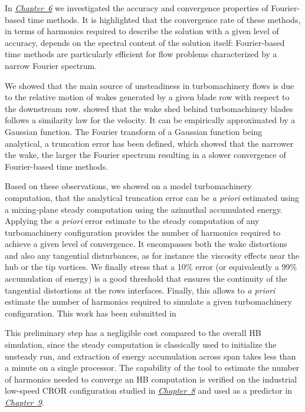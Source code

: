 In \hyperref[cha:limitations_convergence]{\emph{Chapter~6}}
we investigated the accuracy and convergence properties 
of Fourier-based time methods. It is highlighted that the convergence rate 
of these methods, in terms of harmonics required to describe the solution 
with a given level of accuracy, depends on the spectral content of the 
solution itself: Fourier-based time methods are particularly efficient 
for flow problems characterized by a narrow Fourier 
spectrum. 

We showed that the main source of unsteadiness in 
turbomachinery flows is due to the relative motion of wakes 
generated by a given blade row with respect to the downstream row.
\citet{Lakshminarayana1980} showed that the wake shed
behind turbomachinery blades follows a similarity law for the velocity. 
It can be empirically approximated by a Gaussian function.
The Fourier transform of a Gaussian function being analytical,
a truncation error has been defined, which showed that the narrower the wake, 
the larger the Fourier spectrum resulting in a slower convergence 
of Fourier-based time methods.

Based on these observations,
we showed on a model turbomachinery computation, that
the analytical truncation error can be \emph{a priori} 
estimated using a mixing-plane steady computation
using the azimuthal accumulated energy.
Applying the \emph{a priori} error estimate to 
the steady computation of any turbomachinery configuration
provides the number of harmonics required 
to achieve a given level of convergence.
It encompasses both the wake distortions and also
any tangential disturbances, as for instance
the viscosity effects near the hub or the tip vortices.
We finally stress that a 10\% error (or equivalently 
a 99\% accumulation of energy) is a good threshold
that ensures the continuity of the tangential distortions at the rows
interfaces. Finally, this allows to \emph{a priori}
estimate the number of harmonics required to simulate
a given turbomachinery configuration.
This work has been submitted in
\begin{quote}
\end{quote}

This preliminary step has a negligible cost compared to the overall HB
simulation, since the steady computation is classically used to initialize 
the unsteady run, and extraction of energy accumulation across span takes 
less than a minute on a single processor. The capability of the
tool to estimate the number of harmonics needed
to converge an HB computation is verified on the industrial low-speed CROR configuration
studied in \hyperref[cha:dream_ls_isolated]{\emph{Chapter~8}}
and used as a predictor in \hyperref[cha:dream_hs_isolated]{\emph{Chapter~9}}.


